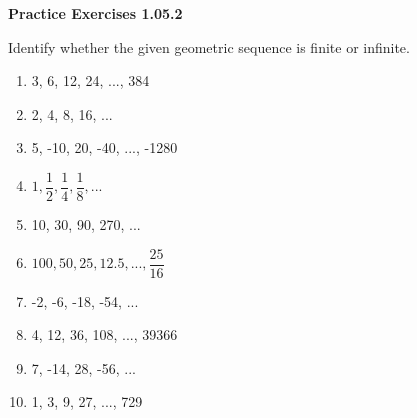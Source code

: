 \vspace{0.3ex}
\noindent\textbf{Practice Exercises 1.05.2}

\vspace{0.2ex}

Identify whether the given geometric sequence is finite or infinite.
\begin{multicols}{2}
\begin{enumerate}
    \item 3, 6, 12, 24, ..., 384
    \item 2, 4, 8, 16, ...
    \item 5, -10, 20, -40, ..., -1280
    \item \(1, \dfrac{1}{2}, \dfrac{1}{4}, \dfrac{1}{8}, ...\)
    \item 10, 30, 90, 270, ...
    \item \(100, 50, 25, 12.5, ..., \dfrac{25}{16}\)
    \item -2, -6, -18, -54, ...
    \item 4, 12, 36, 108, ..., 39366
    \item 7, -14, 28, -56, ...
    \item 1, 3, 9, 27, ..., 729
\end{enumerate}
\end{multicols}
